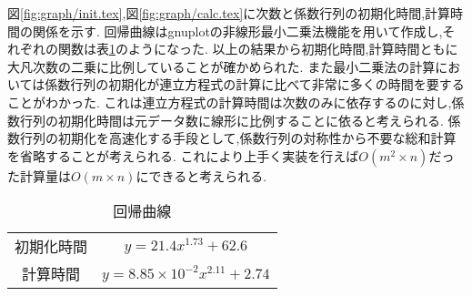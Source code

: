 図\ref{fig:graph/init.tex},図\ref{fig:graph/calc.tex}に次数と係数行列の初期化時間,計算時間の関係を示す.
回帰曲線はgnuplotの非線形最小二乗法機能を用いて作成し,それぞれの関数は表\ref{tab:per_kaiki}のようになった.
以上の結果から初期化時間,計算時間ともに大凡次数の二乗に比例していることが確かめられた.
また最小二乗法の計算においては係数行列の初期化が連立方程式の計算に比べて非常に多くの時間を要することがわかった.
これは連立方程式の計算時間は次数のみに依存するのに対し,係数行列の初期化時間は元データ数に線形に比例することに依ると考えられる.
係数行列の初期化を高速化する手段として,係数行列の対称性から不要な総和計算を省略することが考えられる.
これにより上手く実装を行えば$O(m^2\times n)$だった計算量は$O(m\times n)$にできると考えられる.
\begin{table}[h]
\caption{回帰曲線}
\label{tab:per_kaiki}
\centering
\begin{tabular}{cc}
\hline
初期化時間&$y=21.4x^{1.73}+62.6$\\
計算時間&$y=8.85\times10^{-2}x^{2.11}+2.74$\\
\hline
\end{tabular}
\end{table}
